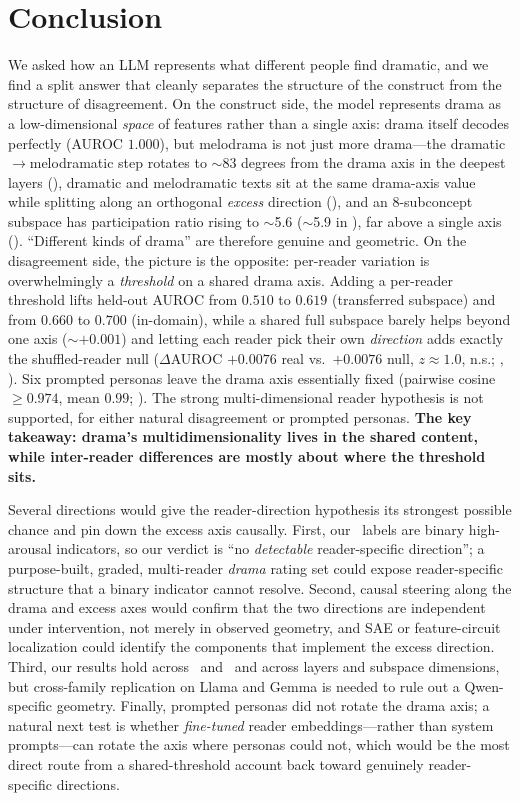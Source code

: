 \section{Conclusion}\label{sec:conclusion}

We asked how an LLM represents what different people find dramatic, and we find a split answer that cleanly separates the structure of the construct from the structure of disagreement. On the construct side, the model represents drama as a low-dimensional \emph{space} of features rather than a single axis: drama itself decodes perfectly (AUROC $1.000$), but melodrama is not just more drama---the dramatic$\to$melodramatic step rotates to $\sim$83 degrees from the drama axis in the deepest layers (), dramatic and melodramatic texts sit at the same drama-axis value while splitting along an orthogonal \emph{excess} direction (), and an 8-subconcept subspace has participation ratio rising to $\sim$5.6 ($\sim$5.9 in \qwensmall), far above a single axis (). ``Different kinds of drama'' are therefore genuine and geometric. On the disagreement side, the picture is the opposite: per-reader variation is overwhelmingly a \emph{threshold} on a shared drama axis. Adding a per-reader threshold lifts held-out AUROC from $0.510$ to $0.619$ (transferred subspace) and from $0.660$ to $0.700$ (in-domain), while a shared full subspace barely helps beyond one axis ($\sim+0.001$) and letting each reader pick their own \emph{direction} adds exactly the shuffled-reader null ($\Delta$AUROC $+0.0076$ real vs.\ $+0.0076$ null, $z\!\approx\!1.0$, n.s.; , ). Six prompted personas leave the drama axis essentially fixed (pairwise cosine $\geq 0.974$, mean $0.99$; ). The strong multi-dimensional reader hypothesis is not supported, for either natural disagreement or prompted personas. {\bf The key takeaway: drama's multidimensionality lives in the shared content, while inter-reader differences are mostly about where the threshold sits.}

Several directions would give the reader-direction hypothesis its strongest possible chance and pin down the excess axis causally. First, our \goemotions\ labels are binary high-arousal indicators, so our verdict is ``no \emph{detectable} reader-specific direction''; a purpose-built, graded, multi-reader \emph{drama} rating set could expose reader-specific structure that a binary indicator cannot resolve. Second, causal steering along the drama and excess axes \citep{wollschlager2025geometry} would confirm that the two directions are independent under intervention, not merely in observed geometry, and SAE or feature-circuit localization \citep{marks2024sfc} could identify the components that implement the excess direction. Third, our results hold across \qwensmall\ and \qwenbig\ and across layers and subspace dimensions, but cross-family replication on Llama and Gemma is needed to rule out a Qwen-specific geometry. Finally, prompted personas did not rotate the drama axis; a natural next test is whether \emph{fine-tuned} reader embeddings---rather than system prompts---can rotate the axis where personas could not, which would be the most direct route from a shared-threshold account back toward genuinely reader-specific directions.
